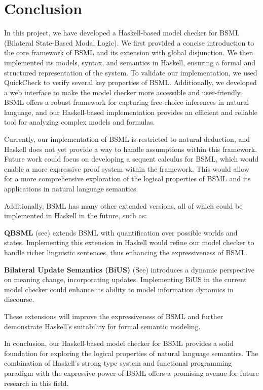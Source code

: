 \section{Conclusion}\label{sec:Conclusion}

In this project, we have developed a Haskell-based model checker for BSML (Bilateral State-Based Modal Logic). 
We first provided a concise introduction to the core framework of BSML and its extension with global disjunction.
We then implemented its models, syntax, and semantics in Haskell, ensuring a formal and structured representation of the system.\@ 
To validate our implementation, we used QuickCheck to verify several key properties of BSML.\@
Additionally, we developed a web interface to make the model checker more accessible and user-friendly.
BSML offers a robust framework for capturing free-choice inferences in natural language,
and our Haskell-based implementation provides an efficient and reliable tool for analyzing complex models and formulas.


Currently, our implementation of BSML is restricted to natural deduction, and Haskell does not yet provide a way to handle assumptions within this framework.
Future work could focus on developing a sequent calculus for BSML, which would enable a more expressive proof system within the framework.
This would allow for a more comprehensive exploration of the logical properties of BSML and its applications in natural language semantics.

Additionally, BSML has many other extended versions, all of which could be implemented in Haskell in the future, such as:

\textbf{QBSML} (see\cite{Aloni2023}) extends BSML with quantification over possible worlds and states. Implementing this extension in Haskell would refine our model checker to handle richer linguistic sentences, thus enhancing the expressiveness of BSML.\@

\textbf{Bilateral Update Semantics (BiUS)} (See\cite{BiUS2023}) introduces a dynamic perspective on meaning change, incorporating updates. Implementing BiUS in the current model checker could enhance its ability to model information dynamics in discourse.

These extensions will improve the expressiveness of BSML and further demonstrate Haskell's suitability for formal semantic modeling.

In conclusion, our Haskell-based model checker for BSML provides a solid foundation for exploring the logical properties of natural language semantics.
The combination of Haskell's strong type system and functional programming paradigm with the expressive power of BSML offers a promising avenue for future research in this field.
